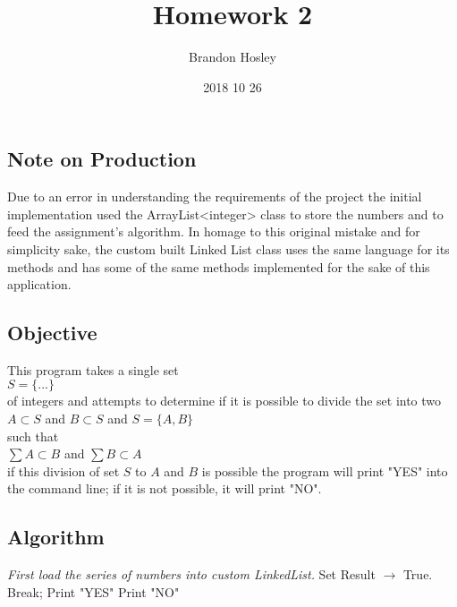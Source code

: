 \documentclass[a4paper,man,natbib]{apa6}
\title{Homework 2}
\author{Brandon Hosley}
\date{2018 10 26}
\affiliation{Brian-Thomas Rogers}
\begin{document}
\maketitle

\subsection{Note on Production}
Due to an error in understanding the requirements of the project the initial implementation used the ArrayList<integer> class to store the numbers and to feed the assignment's algorithm. In homage to this original mistake and for simplicity sake, the custom built Linked List class uses the same language for its methods and has some of the same methods implemented for the sake of this application.

\subsection{Objective}
\noindent
This program takes a single set \\ 
$ S = \{...\} $ \\ \noindent
of integers and attempts to determine if it is possible to divide the set into two \\
$ A \subset S $ and $ B \subset S $ and $ S=\{A,B\} $\\ \noindent
such that \\
$ \sum A \subset B $ and $ \sum B \subset A $ \\ \noindent
if this division of set $S$ to $A$ and $B$ is possible the program will print "YES" into the command line; if it is not possible, it will print "NO". \\

\subsection{Algorithm}

\begin{algorithm}[H]
	\begin{algorithmic}
		\State\emph{First load the series of numbers into custom LinkedList.}
				\State Set Result $\rightarrow$ True.
				\State Break;
			\EndIf
		\EndFor
			\State Print "YES"
		\Else
			\State Print "NO"
		\EndIf		
	\end{algorithmic}
	\caption{}
\end{algorithm}
\end{document}
